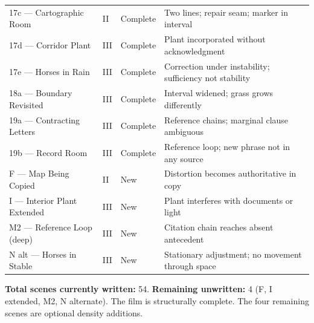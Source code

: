\documentclass[12pt, oneside]{amsart}
\begin{document}
\begin{longtable}{p{3.2cm}p{1.5cm}p{1.5cm}p{5.8cm}}
17c — Cartographic Room & II & Complete & Two lines; repair seam; marker in interval \\
17d — Corridor Plant & III & Complete & Plant incorporated without acknowledgment \\
17e — Horses in Rain & III & Complete & Correction under instability; sufficiency not stability \\
18a — Boundary Revisited & III & Complete & Interval widened; grass grows differently \\
19a — Contracting Letters & III & Complete & Reference chains; marginal clause ambiguous \\
19b — Record Room & III & Complete & Reference loop; new phrase not in any source \\
F — Map Being Copied & II & New & Distortion becomes authoritative in copy \\
I — Interior Plant Extended & III & New & Plant interferes with documents or light \\
M2 — Reference Loop (deep) & III & New & Citation chain reaches absent antecedent \\
N alt — Horses in Stable & III & New & Stationary adjustment; no movement through space \\
\end{longtable}

\bigskip

\noindent\textbf{Total scenes currently written:} 54. \textbf{Remaining unwritten:} 4 (F, I extended, M2, N alternate). The film is structurally complete. The four remaining scenes are optional density additions.
\end{document}
